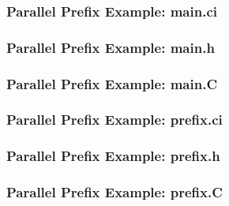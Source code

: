 \documentclass{beamer}
\begin{document}


\begin{frame}[fragile]
  \frametitle{Parallel Prefix Example: main.ci}
  
\end{frame}

\begin{frame}[fragile]
  \frametitle{Parallel Prefix Example: main.h}
  
\end{frame}

\begin{frame}[allowframebreaks]
  \frametitle{Parallel Prefix Example: main.C}
  
\end{frame}

\begin{frame}[fragile]
  \frametitle{Parallel Prefix Example: prefix.ci}
  
\end{frame}

\begin{frame}[allowframebreaks]
  \frametitle{Parallel Prefix Example: prefix.h}
  
\end{frame}

\begin{frame}[allowframebreaks]
  \frametitle{Parallel Prefix Example: prefix.C}
  
\end{frame}
\end{document}
